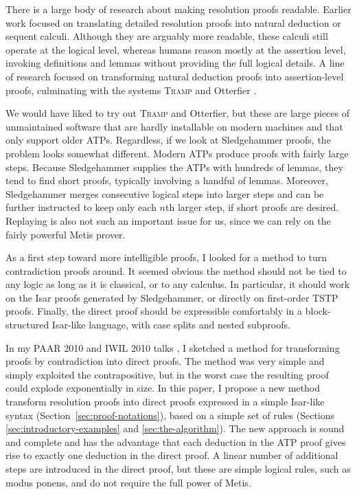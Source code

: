\documentclass[withtimes,a4paper,12pt]{easychair}
\begin{document}
There is a large body of research about making resolution proofs
readable. Earlier work focused on translating detailed resolution
proofs into natural deduction or sequent calculi. %
Although they are arguably more readable, these calculi still operate
at the logical level, whereas humans reason mostly at the assertion
level, invoking definitions and lemmas without providing the full
logical details. %
A line of research focused on
transforming natural deduction proofs into assertion-level proofs,
culminating with the systems \textsc{Tramp} \cite{meier-2000} and Otterfier
\cite{zimmer-et-al-2004}.

We would have liked to try out \textsc{Tramp} and Otterfier, but these are large
pieces of unmaintained software that are hardly installable on modern machines
and that only support older ATPs. Regardless, if we look at Sledgehammer proofs,
the problem looks somewhat different. Modern ATPs produce proofs with fairly
large steps. Because Sledgehammer supplies the ATPs with hundreds of lemmas,
they tend to find short proofs, typically involving a handful of lemmas.
Moreover, Sledgehammer merges consecutive logical steps into larger steps and
can be further instructed to keep only each $n$th larger step, if short proofs
are desired. Replaying is also not such an important issue for us, since we can
rely on the fairly powerful Metis prover.

As a first step toward more intelligible proofs, I looked for a method to turn
contradiction proofs around. It seemed obvious the method should not be tied to
any logic as long as it is classical, or to any calculus. In particular, it
should work on the Isar proofs generated by Sledgehammer, or directly on
first-order TSTP proofs. Finally, the direct proof should be expressible
comfortably in a block-structured Isar-like language, with case splits and
nested subproofs.

In my PAAR 2010 and IWIL 2010 talks \cite{blanchette-paulson-2010,paulson-2010},
I sketched a method for transforming proofs by contradiction into direct proofs.
The method was very simple and simply exploited the contrapositive, but in the
worst case the resulting proof could explode exponentially in size. In this
paper, I propose a new method transform resolution proofs into direct proofs
expressed in a simple Isar-like syntax (Section~\ref{sec:proof-notations}),
based on a simple set of rules (Sections \ref{sec:introductory-examples} and
\ref{sec:the-algorithm}). The new approach is sound and complete and has the
advantage that each deduction in the ATP proof gives rise to exactly one
deduction in the direct proof. A linear number of additional steps are
introduced in the direct proof, but these are simple logical rules, such as
modus ponens, and do not require the full power of Metis.
\end{document}
